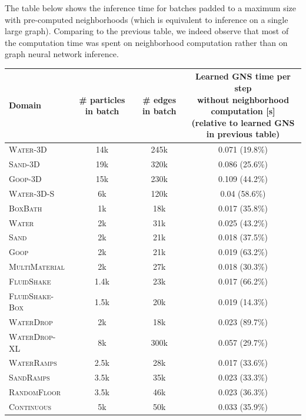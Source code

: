 \documentclass{article}
\newcommand{\multiline}[3][11mm]{\begin{minipage}[c][#1]{#2}#3\end{minipage}}
\newcommand\domain[1]{\textsc{#1}}
\begin{document}
The table below shows the inference time for batches padded to a maximum size with pre-computed neighborhoods (which is equivalent to inference on a single large graph). Comparing to the previous table, we indeed observe that most of the computation time was spent on neighborhood computation rather than on graph neural network inference.

\begin{center}
\begin{tabular}[p]{|l||c|c|c|}
	\hline
	\textbf{Domain} &  
	\multiline{16mm}{\centering\textbf{\# particles in batch }} &
	\multiline{16mm}{\centering\textbf{\# edges in batch }} &
	\multiline[15mm]{80mm}{\centering\textbf{Learned GNS time per step \\ without neighborhood computation [s] \\ (relative to learned GNS in previous table)\footnotemark}}\\\hline\hline
    \domain{Water-3D} & 14k & 245k & 0.071 (19.8\%) \\\hline
    \domain{Sand-3D} & 19k & 320k & 0.086 (25.6\%) \\\hline
    \domain{Goop-3D} & 15k & 230k & 0.109 (44.2\%) \\\hline
    \domain{Water-3D-S} & 6k & 120k & 0.04 (58.6\%) \\\hline
    \domain{BoxBath} & 1k & 18k & 0.017 (35.8\%) \\\hline
    \domain{Water} & 2k & 31k & 0.025 (43.2\%) \\\hline
    \domain{Sand} & 2k & 21k & 0.018 (37.5\%) \\\hline
    \domain{Goop} & 2k & 21k & 0.019 (63.2\%) \\\hline
    \domain{MultiMaterial} & 2k & 27k & 0.018 (30.3\%) \\\hline
    \domain{FluidShake} & 1.4k & 23k & 0.017 (66.2\%) \\\hline
    \domain{FluidShake-Box} & 1.5k & 20k & 0.019 (14.3\%) \\\hline
    \domain{WaterDrop} & 2k & 18k & 0.023 (89.7\%) \\\hline
    \domain{WaterDrop-XL} & 8k & 300k & 0.057 (29.7\%) \\\hline
    \domain{WaterRamps} & 2.5k & 28k & 0.017 (33.6\%) \\\hline
    \domain{SandRamps} & 3.5k & 35k & 0.023 (33.3\%) \\\hline
    \domain{RandomFloor} & 3.5k & 46k & 0.023 (36.3\%) \\\hline
    \domain{Continuous} & 5k & 50k & 0.033 (35.9\%) \\\hline
\end{tabular}
\end{center}
\end{document}
